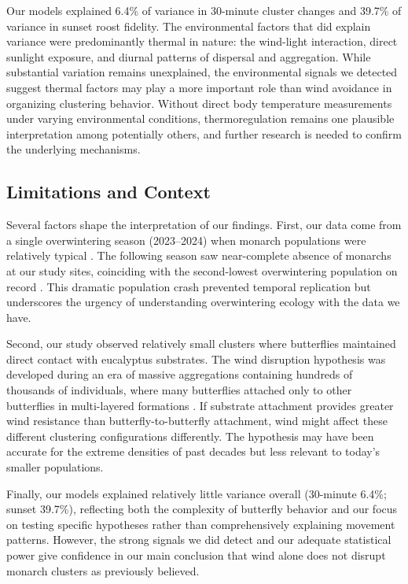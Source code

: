 Our models explained 6.4\% of variance in 30-minute cluster changes and 39.7\% of variance in sunset roost fidelity. The environmental factors that did explain variance were predominantly thermal in nature: the wind-light interaction, direct sunlight exposure, and diurnal patterns of dispersal and aggregation. While substantial variation remains unexplained, the environmental signals we detected suggest thermal factors may play a more important role than wind avoidance in organizing clustering behavior. Without direct body temperature measurements under varying environmental conditions, thermoregulation remains one plausible interpretation among potentially others, and further research is needed to confirm the underlying mechanisms.

\subsection{Limitations and Context}

Several factors shape the interpretation of our findings. First, our data come from a single overwintering season (2023--2024) when monarch populations were relatively typical \parencite{xercessocietyWesternMonarchThanksgiving2025}. The following season saw near-complete absence of monarchs at our study sites, coinciding with the second-lowest overwintering population on record \parencite{xercessocietyWesternMonarchButterfly2025}. This dramatic population crash prevented temporal replication but underscores the urgency of understanding overwintering ecology with the data we have.

Second, our study observed relatively small clusters where butterflies maintained direct contact with eucalyptus substrates. The wind disruption hypothesis was developed during an era of massive aggregations containing hundreds of thousands of individuals, where many butterflies attached only to other butterflies in multi-layered formations \parencite{leongMicroenvironmentalFactorsAssociated1990,browerMonarchButterflyClusters2008}. If substrate attachment provides greater wind resistance than butterfly-to-butterfly attachment, wind might affect these different clustering configurations differently. The hypothesis may have been accurate for the extreme densities of past decades but less relevant to today's smaller populations.

Finally, our models explained relatively little variance overall (30-minute 6.4\%; sunset 39.7\%), reflecting both the complexity of butterfly behavior and our focus on testing specific hypotheses rather than comprehensively explaining movement patterns. However, the strong signals we did detect and our adequate statistical power give confidence in our main conclusion that wind alone does not disrupt monarch clusters as previously believed.

